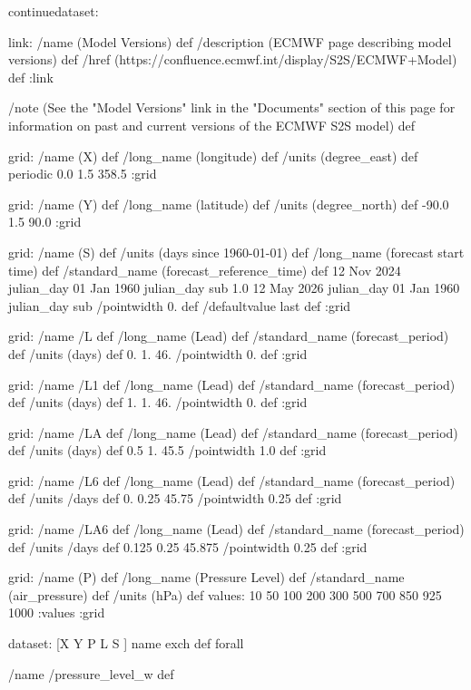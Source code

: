\begin{ingrid}
continuedataset:

link:
 /name (Model Versions) def
 /description (ECMWF page describing model versions) def
 /href (https://confluence.ecmwf.int/display/S2S/ECMWF+Model) def
:link

/note (See the "Model Versions" link in the "Documents" section of this page for information on past and current versions of the ECMWF S2S model) def

grid:
/name (X) def
/long_name (longitude) def
/units (degree_east) def
periodic
0.0 1.5 358.5
:grid

grid:
/name (Y) def
/long_name (latitude) def
/units (degree_north) def
-90.0 1.5 90.0
:grid


grid:
/name (S) def
/units (days since 1960-01-01) def
/long_name (forecast start time) def
/standard_name (forecast_reference_time) def
12 Nov 2024 julian_day 01 Jan 1960 julian_day sub
1.0
12 May 2026 julian_day 01 Jan 1960 julian_day sub
/pointwidth 0. def
/defaultvalue { last } def
:grid


grid:
/name /L def
/long_name (Lead) def
/standard_name (forecast_period) def
/units (days) def
0. 1. 46.
/pointwidth 0. def
:grid

grid:
/name /L1 def
/long_name (Lead) def
/standard_name (forecast_period) def
/units (days) def
1. 1. 46.
/pointwidth 0. def
:grid

grid:
/name /LA def
/long_name (Lead) def
/standard_name (forecast_period) def
/units (days) def
0.5 1. 45.5
/pointwidth 1.0 def
:grid

grid:
/name /L6 def
/long_name (Lead) def
/standard_name (forecast_period) def
/units /days def
0. 0.25 45.75
/pointwidth 0.25 def
:grid

grid:
/name /LA6 def
/long_name (Lead) def
/standard_name (forecast_period) def
/units /days def
0.125 0.25 45.875
/pointwidth 0.25 def
:grid

grid:
/name (P) def
/long_name (Pressure Level) def
/standard_name (air_pressure) def
/units (hPa) def
values: 10 50 100 200 300 500 700 850 925 1000 :values
:grid

dataset:
[X Y P L S ] {name exch def } forall

/name /pressure_level_w def


\end{ingrid}

